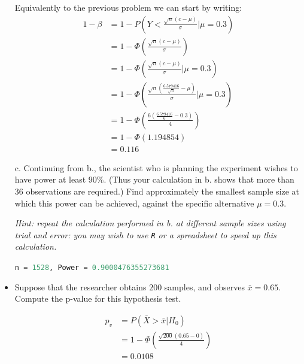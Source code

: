\documentclass{article}
\newcommand{\1}{\mathbf{1}}
\begin{document}
\begin{itemize}
    Equivalently to the previous problem we can start by writing:
    \begin{align*}
        1 - \beta &=  1- P \left(Y < \frac{\sqrt{n}(c - \mu)}{\sigma}  \bigg | \mu=0.3 \right) \\
        &=  1 - \Phi  \left(\frac{\sqrt{n}(c - \mu)}{\sigma}\right) \\
        &= 1- \Phi\left( \frac{\sqrt{n}(c - \mu)}{\sigma}  \bigg | \mu=0.3 \right) \\
        &= 1- \Phi\left( \frac{\sqrt{n} \left(\frac{6.579416}{\sqrt{n}} - \mu \right)}{\sigma}  \bigg | \mu=0.3 \right) \\
        &= 1- \Phi\left( \frac{6\left(\frac{6.579416}{6} - 0.3\right)}{4} \right) \\
        &= 1- \Phi(1.194854 ) \\
        &= 0.116
    \end{align*}

    \item[c.] Continuing from b., the scientist who is planning the experiment wishes to have power at least $90\%$. (Thus your calculation in b. shows that more than $36$ observations are required.) Find approximately the smallest sample size at which this power can be achieved, against the specific alternative $\mu=0.3$.\par 
    {\it Hint: repeat the calculation performed in {\rm b.} at different sample sizes using trial and error: you may wish to use {\tt R} or a spreadsheet to speed up this calculation.}
    
     \lstinline[language=Python]{n = 1528, Power = 0.9000476355273681}
     
    
   

   \item[d.] Suppose that the researcher obtains $200$ samples, and observes $\bar{x} = 0.65$. Compute the p-value for this hypothesis test.
   
   \begin{align*}
       p_v &= P(\bar X > \bar x | H_0) \\
       &= 1 - \Phi \left( \frac{\sqrt{200}(0.65 - 0)}{4} \right)\\
       &= 0.0108
   \end{align*}
\end{itemize}


\newpage
\end{document}
